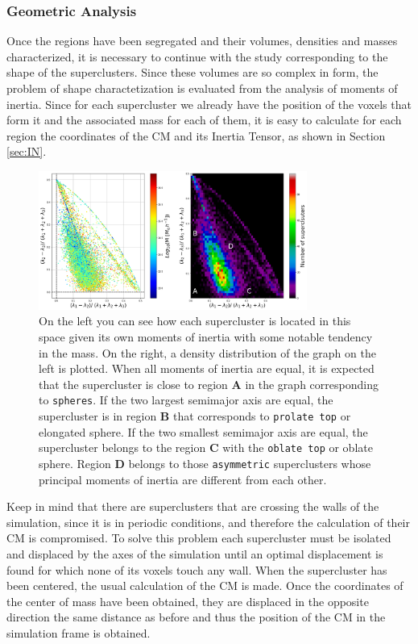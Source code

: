 \documentclass[a4paper,fleqn,usenatbib]{mnras}
\begin{document}
\subsubsection{Geometric Analysis}
Once the regions have been segregated and their volumes, densities and masses characterized, it is necessary to continue with the study corresponding to the shape of the superclusters. Since these volumes are so complex in form, the problem of shape charactetization is evaluated from the analysis of moments of inertia. Since for each supercluster we already have the position of the voxels that form it and the associated mass for each of them, it is easy to calculate for each region the coordinates of the CM and its Inertia Tensor, as shown in Section \ref{sec:IN}.

\begin{figure}
    \centering
    \includegraphics[width=250pt]{shapeStats_1M.png}
    \caption{On the left you can see how each supercluster is located in this space given its own moments of inertia with some notable tendency in the mass. On the right, a density distribution of the graph on the left is plotted. When all moments of inertia are equal, it is expected that the supercluster is close to region \textbf{A} in the graph corresponding to \texttt{spheres}. If the two largest semimajor axis are equal, the supercluster is in region \textbf{B} that corresponds to \texttt{prolate top} or elongated sphere. If the two smallest semimajor axis are equal, the supercluster belongs to the region \textbf{C} with the \texttt{oblate top} or oblate sphere. Region \textbf{D} belongs to those \texttt{asymmetric} superclusters whose principal moments of inertia are different from each other.}
    \label{fig:INERTIA}
\end{figure}

Keep in mind that there are superclusters that are crossing the walls of the simulation, since it is in periodic conditions, and therefore the calculation of their CM is compromised. To solve this problem each supercluster must be isolated and displaced by the axes of the simulation until an optimal displacement is found for which none of its voxels touch any wall. When the supercluster has been centered, the usual calculation of the CM is made. Once the coordinates of the center of mass have been obtained, they are displaced in the opposite direction the same distance as before and thus the position of the CM in the simulation frame is obtained.
\end{document}
